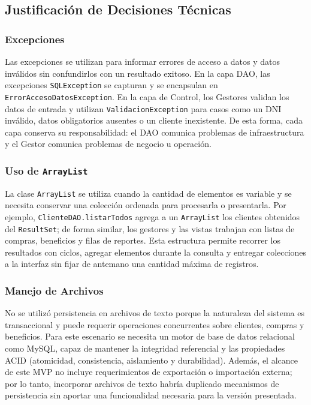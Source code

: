 \documentclass{article}
\begin{document}
\subsection{Justificación de Decisiones Técnicas}
\subsubsection{Excepciones}
Las excepciones se utilizan para informar errores de acceso a datos y datos inválidos sin confundirlos con un resultado exitoso. En la capa DAO, las excepciones \texttt{SQLException} se capturan y se encapsulan en \texttt{ErrorAccesoDatosException}. En la capa de Control, los Gestores validan los datos de entrada y utilizan \texttt{ValidacionException} para casos como un DNI inválido, datos obligatorios ausentes o un cliente inexistente. De esta forma, cada capa conserva su responsabilidad: el DAO comunica problemas de infraestructura y el Gestor comunica problemas de negocio u operación.

\subsubsection{Uso de \texttt{ArrayList}}
La clase \texttt{ArrayList} se utiliza cuando la cantidad de elementos es variable y se necesita conservar una colección ordenada para procesarla o presentarla. Por ejemplo, \texttt{ClienteDAO.listarTodos} agrega a un \texttt{ArrayList} los clientes obtenidos del \texttt{ResultSet}; de forma similar, los gestores y las vistas trabajan con listas de compras, beneficios y filas de reportes. Esta estructura permite recorrer los resultados con ciclos, agregar elementos durante la consulta y entregar colecciones a la interfaz sin fijar de antemano una cantidad máxima de registros.

\subsubsection{Manejo de Archivos}
No se utilizó persistencia en archivos de texto porque la naturaleza del sistema es transaccional y puede requerir operaciones concurrentes sobre clientes, compras y beneficios. Para este escenario se necesita un motor de base de datos relacional como MySQL, capaz de mantener la integridad referencial y las propiedades ACID (atomicidad, consistencia, aislamiento y durabilidad). Además, el alcance de este MVP no incluye requerimientos de exportación o importación externa; por lo tanto, incorporar archivos de texto habría duplicado mecanismos de persistencia sin aportar una funcionalidad necesaria para la versión presentada.
\end{document}

